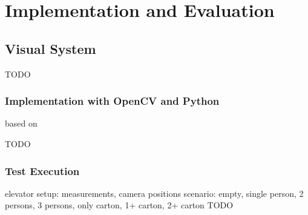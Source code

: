 \chapter{Implementation and Evaluation}
\label{chap:impl}


\section{Visual System}
TODO
\subsection{Implementation with OpenCV and Python}

based on \autocite[][]{xocoatzin2013voxelcarving}

TODO
\subsection{Test Execution}
elevator setup: measurements, camera positions
scenario: empty, single person, 2 persons, 3 persons, only carton, 1+ carton, 2+ carton
TODO

